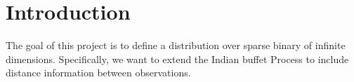 \chapter{Introduction} %

The goal of this project is to define a distribution over sparse binary of
infinite dimensions. Specifically, we want to extend the Indian buffet Process
to include distance information between observations. 

